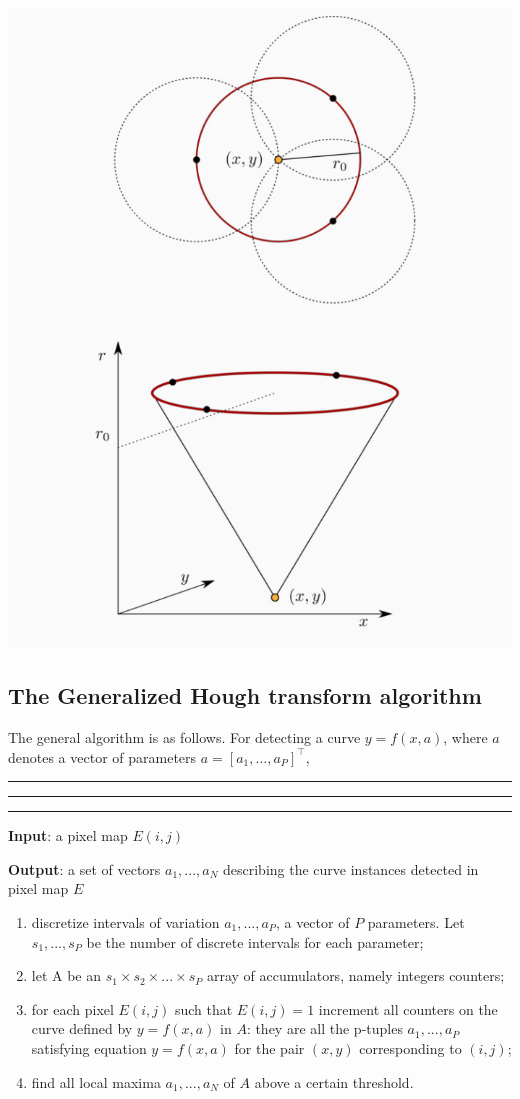 \documentclass[10pt]{report}
\begin{document}
\begin{center}
\includegraphics[width=.9\linewidth]{./pics/fit/hough-circles.jpg}
\end{center}

\subsection{The Generalized Hough transform algorithm}
\label{the-generalized-hough-transform-algorithm}
The general algorithm is as follows. For detecting a curve
\(y = f(x, a)\), where \(a\) denotes a vector of parameters
\(a = [a_1, \dots, a_P]^\top\),

\vspace*{0.6cm}\hrule
\hrule
\hrule
\vspace*{0.4cm}

\textbf{Input}: a pixel map \(E(i, j)\)

\textbf{Output}: a set of vectors \(a_1, ..., a_N\) describing the curve
instances detected in pixel map \(E\)

\begin{enumerate}
\item discretize intervals of variation \(a_1, ..., a_P\), a vector of
\(P\) parameters. Let \(s_1, ..., s_P\) be the number of discrete
intervals for each parameter;
\item let A be an \(s_1 \times s_2 \times ... \times s_P\) array of
accumulators, namely integers counters;
\item for each pixel \(E(i, j)\) such that \(E(i, j) = 1\) increment all
counters on the curve defined by \(y = f(x, a)\) in \(A\): they are
all the p-tuples \(a_1, ..., a_P\) satisfying equation
\(y = f(x, a)\) for the pair \((x, y)\) corresponding to \((i, j)\);
\item find all local maxima \(a_1, ..., a_N\) of \(A\) above a certain
threshold.
\end{enumerate}
\end{document}
